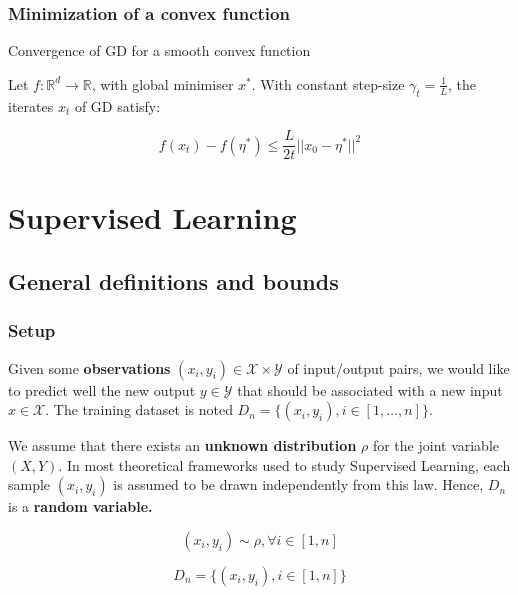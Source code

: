 \documentclass[
10pt, %
a4paper, %
oneside, %
headinclude,footinclude, %
BCOR5mm, %
]{scrartcl}
\begin{document}
\subsubsection{\large\color{Periwinkle}Minimization of a convex function}

\begin{theorem}{Convergence of GD for a smooth convex function}

    Let $f: \mathbb{R}^d\rightarrow \mathbb{R} $, with global minimiser $x^*$.
    With constant step-size $\gamma_t = \frac{1}{L} $, the iterates $x_t$ of GD
    satisfy:

    \begin{equation*}
	f(x_t)-f(\eta^*)\leq \frac{L}{2t} ||x_0-\eta^*||^2
    \end{equation*}
\end{theorem}


\section{\large\color{Blue}Supervised Learning}

\subsection{\large\color{MidnightBlue}General definitions and bounds}

\subsubsection{\large\color{Periwinkle}Setup}

Given some \textbf{{observations}} $(x_i,y_i)\in \mathcal{X} \times \mathcal{Y}$ of input/output pairs, we would like to predict well the new output $y\in \mathcal{Y} $ that should be associated with a new input $x\in \mathcal{X} $. The training dataset is noted $D_n = \{(x_i, y_i), i\in [1, \dots, n]\}$.

We assume that there exists an \textbf{{unknown distribution}} $\rho$ for the joint variable $(X,Y)$.  In most theoretical frameworks used to study Supervised Learning, each sample $(x_i,y_i)$ is assumed to be drawn independently from this law. Hence, $D_n$ is a \textbf{{random variable.}} 

\begin{equation}
    (x_i,y_i)\sim \rho, \forall i\in[1, n]
\end{equation}

\begin{equation}
    D_n = \{ (x_i,y_i),  i\in[1, n]\}
\end{equation}
\end{document}
